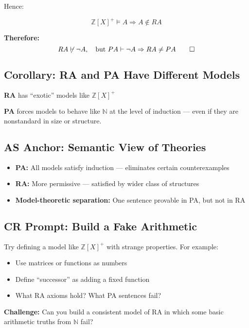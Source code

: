 \documentclass[12pt]{article}
\begin{document}
Hence:

\[
\mathbb{Z}[X]^+ \models A
\Rightarrow A \notin RA
\]

\textbf{Therefore:}
\[
RA \not\vdash \neg A, \quad \text{but } PA \vdash \neg A
\Rightarrow RA \neq PA
\qed
\]

\subsection{Corollary: RA and PA Have Different Models}

\textbf{RA} has “exotic” models like \( \mathbb{Z}[X]^+ \)

\textbf{PA} forces models to behave like \( \mathbb{N} \) at the level of induction — even if they are nonstandard in size or structure.

\subsection*{AS Anchor: Semantic View of Theories}

\begin{itemize}
  \item \textbf{PA:} All models satisfy induction — eliminates certain counterexamples
  \item \textbf{RA:} More permissive — satisfied by wider class of structures
  \item \textbf{Model-theoretic separation:} One sentence provable in PA, but not in RA
\end{itemize}

\subsection*{CR Prompt: Build a Fake Arithmetic}

Try defining a model like \( \mathbb{Z}[X]^+ \) with strange properties. For example:

\begin{itemize}
  \item Use matrices or functions as numbers
  \item Define “successor” as adding a fixed function
  \item What RA axioms hold? What PA sentences fail?
\end{itemize}

\textbf{Challenge:} Can you build a consistent model of RA in which some basic arithmetic truths from \( \mathbb{N} \) fail?

\end{document}
